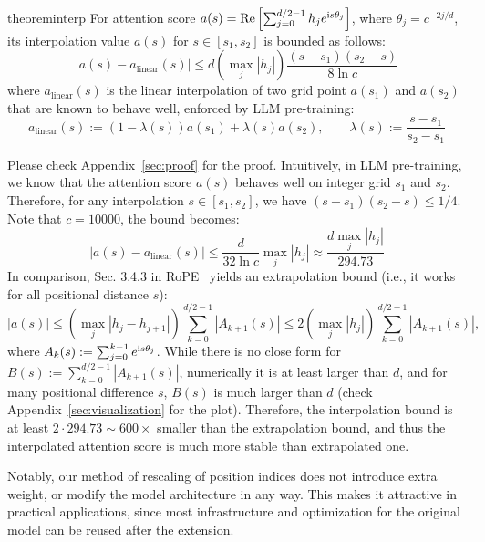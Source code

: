 \documentclass{article} %
\theoremstyle{definition}
\begin{document}
\begin{restatable}{theorem}{interp}
For attention score $a(s) = \mathrm{Re}\left[\sum_{j=0}^{d/2-1} h_j e^{\mathrm{i} s \theta_j}\right]$, where $\theta_j = c^{-2j/d}$, its interpolation value $a(s)$ for $s \in [s_1, s_2]$ is bounded as follows:
\begin{equation}
    |a(s) - a_{\mathrm{linear}}(s)| \le d\left(\max_j |h_j|\right) \frac{(s-s_1)(s_2-s)}{8\ln c} \label{eq:interp-bound}
\end{equation}
where $a_{\mathrm{linear}}(s)$ is the linear interpolation of two grid point $a(s_1)$ and $a(s_2)$ that are known to behave well, enforced by LLM pre-training:
\begin{equation}
    a_{\mathrm{linear}}(s) := (1-\lambda(s)) a(s_1) + \lambda(s) a(s_2), \quad\quad \lambda(s) := \frac{s-s_1}{s_2-s_1}  
\end{equation}
\end{restatable}
Please check Appendix~\ref{sec:proof} for the proof. Intuitively, in LLM pre-training, we know that the attention score $a(s)$ behaves well on integer grid $s_1$ and $s_2$. Therefore, for any interpolation $s\in [s_1,s_2]$, we have $(s-s_1)(s_2-s) \le 1/4$. Note that $c = 10000$, the bound becomes:
\begin{equation}
    |a(s) - a_{\mathrm{linear}}(s)| \le \frac{d}{32 \ln c}\max_j |h_j| \approx \frac{d \max_j |h_j|}{294.73}    
\end{equation}
In comparison, Sec. 3.4.3 in RoPE~\citep{su2021roformer} yields an extrapolation bound (i.e., it works for all positional distance $s$):
\begin{equation}
 |a(s)| \le \left(\max_{j} |h_j - h_{j+1}|\right) \sum_{k=0}^{d/2-1} |A_{k+1}(s)| \le 2\left(\max_{j} |h_j|\right) \sum_{k=0}^{d/2-1} |A_{k+1}(s)| \label{eq:extra-bound}, 
\end{equation}
where $A_k(s) := \sum_{j=0}^{k-1} e^{\mathrm{i} s \theta_j}$. While there is no close form for $B(s) := \sum_{k=0}^{d/2-1} |A_{k+1}(s)|$, numerically it is at least larger than $d$, and for many positional difference $s$, $B(s)$ is much larger than $d$ (check Appendix~\ref{sec:visualization} for the plot). Therefore, the interpolation bound is at least $2 \cdot 294.73\sim 600\times$ smaller than the extrapolation bound, and thus the interpolated attention score is much more stable than extrapolated one.  

Notably, our method of rescaling of position indices does not introduce extra weight, or modify the model architecture in any way. This makes it attractive in practical applications, since most infrastructure and optimization for the original model can be reused after the extension.  
\end{document}
